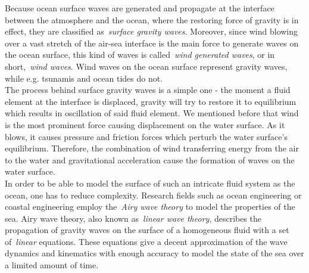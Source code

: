 % 
Because ocean surface waves are generated and propagate at the interface between the atmosphere
and the ocean, where the restoring force of gravity is in effect, they are classified as~\emph{surface gravity waves}.
Moreover, since wind blowing over a vast stretch of the air-sea interface is the main force to generate waves on
the ocean surface, this kind of waves is called~\emph{wind generated waves},
or in short,~\emph{wind waves}. Wind waves on the ocean surface represent
gravity waves, while e.g. tsunamis and ocean tides do not.\\

The process behind surface gravity waves is a simple one - the moment a fluid element at the interface is displaced, gravity
will try to restore it to equilibrium which results in oscillation of said fluid element. We mentioned before
that wind is the most prominent force causing displacement on the water surface. As it blows, it causes pressure and friction
forces which perturb the water surface's equilibrium. Therefore, the combination of wind transferring energy from the air
to the water and gravitational acceleration cause the formation of waves on the water surface.\\

In order to be able to model the surface of such an intricate fluid system as the ocean, one has to reduce complexity.
Research fields such as ocean engineering or coastal engineering employ the~\emph{Airy wave theory}\cite{book:airy1845tides}
to model the properties of the sea. Airy wave theory, also known as~\emph{linear wave theory}, describes the propagation of
gravity waves on the surface of a homogeneous fluid with a set of~\emph{linear} equations. These equations give
a decent approximation of the wave dynamics and kinematics with enough accuracy to model the state of the sea over a
limited amount of time.

